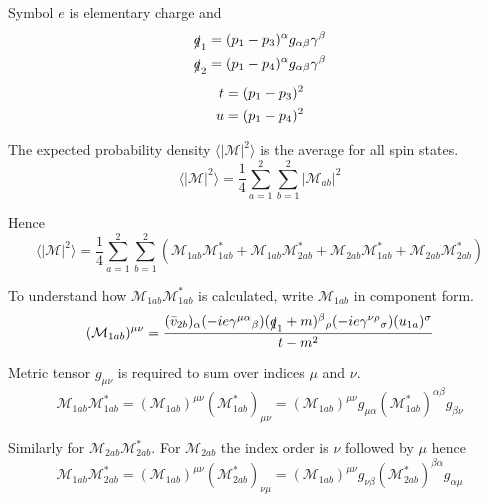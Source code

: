 Symbol $e$ is elementary charge and
\begin{gather*}
\begin{aligned}
\slashed q_1&=(p_1-p_3)^\alpha g_{\alpha\beta}\gamma^\beta
\\
\slashed q_2&=(p_1-p_4)^\alpha g_{\alpha\beta}\gamma^\beta
\end{aligned}
\\[1ex]
\begin{aligned}
t&=(p_1-p_3)^2
\\
u&=(p_1-p_4)^2
\end{aligned}
\end{gather*}

The expected probability density $\langle|\mathcal M|^2\rangle$
is the average for all spin states.
\begin{equation*}
\langle|\mathcal M|^2\rangle=\frac{1}{4}\sum_{a=1}^2\sum_{b=1}^2|\mathcal M_{ab}|^2
\end{equation*}

Hence
\begin{equation*}
\langle|\mathcal{M}|^2\rangle
=\frac{1}{4}\sum_{a=1}^2\sum_{b=1}^2
\left(
\mathcal M_{1ab}\mathcal M_{1ab}^*
+\mathcal M_{1ab}\mathcal M_{2ab}^*+\mathcal M_{2ab}\mathcal M_{1ab}^*
+\mathcal M_{2ab}\mathcal M_{2ab}^*
\right)
\end{equation*}

To understand how $\mathcal M_{1ab}\mathcal M_{1ab}^*$ is calculated,
write $\mathcal M_{1ab}$ in component form.
\begin{equation*}
(\mathcal M_{1ab})^{\mu\nu}=\frac{
(\bar{v}_{2b})_\alpha
(-ie\gamma^{\mu\alpha}{}_\beta)
(\slashed q_1+m)^\beta{}_\rho
(-ie\gamma^{\nu\rho}{}_\sigma)
(u_{1a})^\sigma}{t-m^2}
\end{equation*}

Metric tensor $g_{\mu\nu}$ is required to sum over indices $\mu$ and $\nu$.
\begin{equation*}
\mathcal M_{1ab}\mathcal M_{1ab}^*=(\mathcal M_{1ab})^{\mu\nu}(\mathcal M_{1ab}^*)_{\mu\nu}
=(\mathcal M_{1ab})^{\mu\nu}g_{\mu\alpha}(\mathcal M_{1ab}^*)^{\alpha\beta}g_{\beta\nu}
\end{equation*}

Similarly for $\mathcal M_{2ab}\mathcal M_{2ab}^*$.
For $\mathcal M_{2ab}$ the index order is $\nu$ followed by $\mu$ hence
\begin{equation*}
\mathcal M_{1ab}\mathcal M_{2ab}^*=(\mathcal M_{1ab})^{\mu\nu}(\mathcal M_{2ab}^*)_{\nu\mu}
=(\mathcal M_{1ab})^{\mu\nu}g_{\nu\beta}(\mathcal M_{2ab}^*)^{\beta\alpha}g_{\alpha\mu}
\end{equation*}

